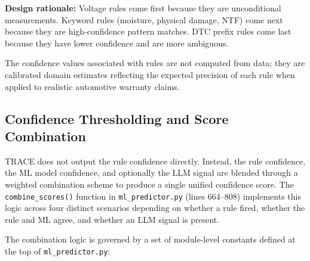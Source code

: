 \documentclass[10pt]{article}
\begin{document}
\textbf{Design rationale:} Voltage rules come first because they are unconditional measurements. Keyword rules (moisture, physical damage, NTF) come next because they are high-confidence pattern matches. DTC prefix rules come last because they have lower confidence and are more ambiguous.

The confidence values associated with rules are not computed from data; they are calibrated domain estimates reflecting the expected precision of each rule when applied to realistic automotive warranty claims.

\subsection{Confidence Thresholding and Score Combination}

TRACE does not output the rule confidence directly. Instead, the rule confidence, the ML model confidence, and optionally the LLM signal are blended through a weighted combination scheme to produce a single unified confidence score. The \texttt{combine\_scores()} function in \texttt{ml\_predictor.py} (lines 664--808) implements this logic across four distinct scenarios depending on whether a rule fired, whether the rule and ML agree, and whether an LLM signal is present.

The combination logic is governed by a set of module-level constants defined at the top of \texttt{ml\_predictor.py}:
\end{document}
